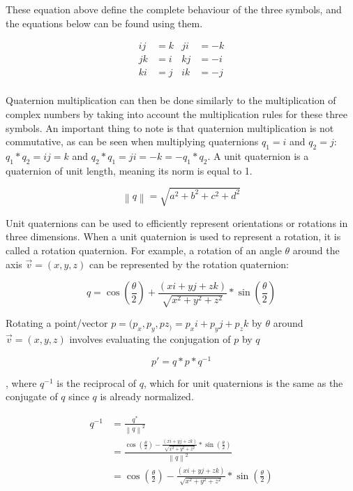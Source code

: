 		These equation above define the complete behaviour of the three symbols, and the equations below can be found using them.
		
		\begin{align*}
			ij &= k & ji &= -k \\
			jk &= i & kj &= -i \\
			ki &= j & ik &= -j \\
		\end{align*}
		
		Quaternion multiplication can then be done similarly to the multiplication of complex numbers by taking into account the multiplication rules for these three symbols. An important thing to note is that quaternion multiplication is not commutative, as can be seen when multiplying quaternions \( q_1 = i \) and \( q_2 = j \): \( q_1*q_2 = ij = k \) and \( q_2*q_1 = ji = -k = -q_1*q_2 \). A unit quaternion is a quaternion of unit length, meaning its norm is equal to 1. 
		
		\begin{equation}
			\left \| q \right \| = \sqrt{a^2 + b^2 + c^2 + d^2}
		\end{equation}
		
		Unit quaternions can be used to efficiently represent orientations or rotations in three dimensions. When a unit quaternion is used to represent a rotation, it is called a rotation quaternion. For example, a rotation of an angle \( \theta \) around the axis \( \vec{v} = (x, y, z) \) can be represented by the rotation quaternion:
		
		\begin{equation}
			q = \cos(\frac{\theta}{2}) + \frac{(xi + yj + zk)}{\sqrt{x^2 + y^2 + z^2}}*\sin(\frac{\theta}{2})
		\end{equation}
		
		Rotating a point/vector \( p = (p_x, p_y, pz_) = p_xi + p_yj + p_zk \) by \( \theta \) around \( \vec{v} = (x, y, z) \) involves evaluating the conjugation of \( p \) by \( q \) 
		
		\begin{equation}
			p' = q*p*q^{-1}
		\end{equation}
		
		, where \( q^{-1} \) is the reciprocal of \( q \), which for unit quaternions is the same as the conjugate of \( q \) since \( q \) is already normalized.
		
		\begin{equation}
		\begin{split}
			q^{-1} & = \frac{q^{\ast}}{{\left \| q \right \|}^2} \\
					& = \frac{\cos(\frac{\theta}{2}) - \frac{(xi + yj + zk)}{\sqrt{x^2 + y^2 + z^2}}*\sin(\frac{\theta}{2})}{{\left \| q \right \|}^2} \\
					& = \cos(\frac{\theta}{2}) - \frac{(xi + yj + zk)}{\sqrt{x^2 + y^2 + z^2}}*\sin(\frac{\theta}{2}) \\
		\end{split}
		\end{equation}
		
